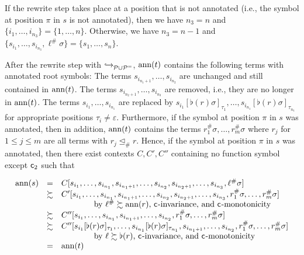 \begin{myproof}
\begin{itemize}
        If the rewrite step takes place at a position that is not annotated (i.e., the symbol at
        position $\pi$ in $s$ is not annotated), then we have $n_3 =
        n$ and $\{ i_1, \ldots, i_{n_3}\} = \{1,\ldots, n\}$. 
        Otherwise, we have $n_3 = n-1$ and $\{s_{i_1},
        \ldots, s_{i_{n_3}}, \ell^\#\sigma\} = \{s_1, \ldots, s_n \}$.

        After the rewrite step with $\mathrel{ \xhookrightarrow{{}_{\scriptstyle }} \!\!{}^{}_{\mathcal{P} \cup \mathcal{P}^{=}} }$,
        $\mathrm{ann}(t)$
        contains the following terms with annotated root symbols:
        The terms
        $s_{i_{n_1 + 1}}, \ldots, s_{i_{n_2}}$ are unchanged and still contained in 
        $\mathrm{ann}(t)$. The terms $s_{i_{n_2 + 1}}, \ldots, s_{i_{n_3}}$ are removed, i.e., they are
        no longer in $\mathrm{ann}(t)$. 
        The terms $s_{i_1}, \ldots, s_{i_{n_1}}$ are replaced by 
        $s_{i_1}[\flat(r) \sigma]_{\tau_{1}}, \ldots, s_{i_{n_1}}[\flat(r) \sigma]_{\tau_{n_1}}$
        for appropriate positions $\tau_i \neq \varepsilon$.
        Furthermore, if
        the symbol at position $\pi$ in $s$ was annotated, then in addition, $\mathrm{ann}(t)$ contains
        the terms $r_1^\#\sigma, \ldots, r_m^\#\sigma$ where $r_j$ for $1 \leq j
        \leq m$ are all terms with $r_j \trianglelefteq_{\#} r$.
        Hence, if the symbol at position $\pi$ in $s$ was annotated, then there exist contexts $C, C', C''$
        containing no function symbol except $\mathsf{c}_{2}$ such that


\vspace*{-.2cm}
        
        {\small\[
            \begin{array}{lcl}
              \mathrm{ann}(s) & = & C[s_{i_1}, \ldots, s_{i_{n_1}},s_{i_{n_1 + 1}}, \ldots,
                s_{i_{n_2}},s_{i_{n_2 + 1}}, \ldots, s_{i_{n_3}},\ell^\#\sigma]\\
              & \succsim & C'[s_{i_1}, \ldots, s_{i_{n_1}},s_{i_{n_1 + 1}}, \ldots,
                s_{i_{n_2}},s_{i_{n_2 + 1}}, \ldots, s_{i_{n_3}},r_1^\#\sigma, \ldots,
                r_m^\#\sigma]\\
              &&\qquad\qquad \text{by $\ell^\# \succsim \mathrm{ann}(r)$, $\mathsf{c}_{}$-invariance, and $\mathsf{c}_{}$-monotonicity}\\
              & \succsim & C''[s_{i_1}, \ldots, s_{i_{n_1}},s_{i_{n_1 + 1}}, \ldots,
                s_{i_{n_2}},r_1^\#\sigma, \ldots,
                r_m^\#\sigma]\\
               & \succsim & C''[s_{i_1}[\flat(r) \sigma]_{\tau_{1}}, \ldots, s_{i_{n_1}}[\flat(r) \sigma]_{\tau_{n_1}},s_{i_{n_1 + 1}}, \ldots,
                s_{i_{n_2}},r_1^\#\sigma, \ldots,
                r_m^\#\sigma]\\
              &&\qquad\qquad \text{by $\ell \succsim \flat(r)$,
                $\mathsf{c}_{}$-invariance, and $\mathsf{c}_{}$-monotonicity}\\
                            & = & \mathrm{ann}(t)\!    
            \end{array}
            \]}



\end{itemize}
\end{myproof}
